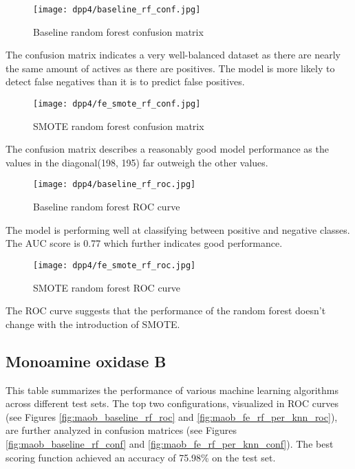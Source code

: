 \begin{figure}[H]
    \begin{center}
        \caption[]{Baseline random forest confusion matrix}
        \label{fig:dpp4_baseline_rf_conf}
        \texttt{[image: dpp4/baseline\_rf\_conf.jpg]}
    \end{center}
\end{figure}
The confusion matrix indicates a very well-balanced dataset as there are nearly the same amount of actives as there are positives. The model is more likely to detect false negatives than it is to predict false positives.
\begin{figure}[H]
    \begin{center}
        \caption[]{SMOTE random forest confusion matrix}
        \label{fig:dpp4_smote_rf_conf}
        \texttt{[image: dpp4/fe\_smote\_rf\_conf.jpg]}
    \end{center}

\end{figure}
The confusion matrix describes a reasonably good model performance as the values in the diagonal(198, 195) far outweigh the other values.

\begin{figure}[H]
    \begin{center}
        \caption[]{Baseline random forest ROC curve}
        \label{fig:dpp4_baseline_rf_roc}
        \texttt{[image: dpp4/baseline\_rf\_roc.jpg]}
    \end{center}
\end{figure}
The model is performing well at classifying between positive and negative classes. The AUC score is 0.77 which further indicates good performance.

\begin{figure}[H]
    \begin{center}
        \caption[]{SMOTE random forest ROC curve}
        \label{fig:dpp4_smote_rf_roc}
        \texttt{[image: dpp4/fe\_smote\_rf\_roc.jpg]}
    \end{center}
\end{figure}
The ROC curve suggests that the performance of the random forest doesn't change with the introduction of SMOTE.

\subsection{Monoamine oxidase B}
This table summarizes the performance of various machine learning algorithms across different test sets.
The top two configurations, visualized in ROC curves (see Figures \ref{fig:maob_baseline_rf_roc} and \ref{fig:maob_fe_rf_per_knn_roc}),
are further analyzed in confusion matrices (see Figures \ref{fig:maob_baseline_rf_conf} and \ref{fig:maob_fe_rf_per_knn_conf}). 
The best scoring function achieved an accuracy of 75.98\% on the test set.

